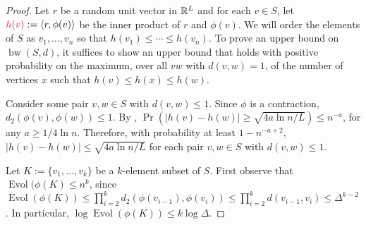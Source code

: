 \documentclass{patmorin}
\makeatletter
\def\mathcolor#1#{\@mathcolor{#1}}
\def\@mathcolor#1#2#3{%
  \protect\leavevmode
  \begingroup
    \color#1{#2}#3%
  \endgroup
}
\newcommand{\mathdefin}[1]{\mathcolor{brightmaroon}{#1}}
\DeclareMathOperator{\bw}{bw}
\DeclareMathOperator{\evol}{Evol}
\makeatother
\begin{document}
\begin{proof}
  Let $r$ be a random unit vector in $\mathbb{R}^L$ and for each $v\in S$, let $\mathdefin{h(v)}:=\langle r,\phi(v)\rangle$ be the inner product of $r$ and $\phi(v)$.  We will order the elements of $S$ as $v_1,\ldots,v_n$ so that $h(v_1)\le \cdots \le h(v_n)$.  To prove an upper bound on $\bw(S,d)$, it suffices to show an upper bound that holds with positive probability on the maximum, over all $vw$ with $d(v,w)=1$, of the number of vertices $x$ such that $h(v)\le h(x)\le h(w)$.

  Consider some pair $v,w\in S$ with $d(v,w)\le 1$. Since $\phi$ is a contraction, $d_2(\phi(v),\phi(w))\le 1$.  By \cite[Proposition~7]{feige:approximating}, $\Pr(|h(v)-h(w)|\ge \sqrt{4a\ln n/L}) \le n^{-a}$, for any $a\ge 1/4\ln n$. Therefore, with probability at least $1-n^{-a+2}$, $|h(v)-h(w)|\le \sqrt{4a\ln n/L}$ for each pair $v,w\in S$ with $d(v,w)\le 1$.

  Let  $K:=\{v_1,\ldots,v_k\}$ be a $k$-element subset of $S$. First observe that $\evol(\phi(K)\le n^k$, since $\evol(\phi(K))\le\prod_{i=2}^k d_2(\phi(v_{i-1}),\phi(v_i))\le \prod_{i=2}^k d(v_{i-1},v_i)\le \Delta^{k-2}$.  In particular, $\log\evol(\phi(K))\le k\log \Delta$.


\end{proof}
\end{document}
